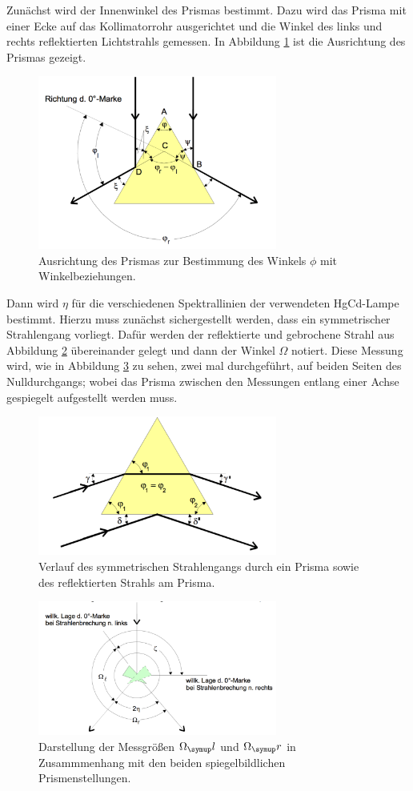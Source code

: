 Zunächst wird der Innenwinkel des Prismas bestimmt.
Dazu wird das Prisma mit einer Ecke auf das Kollimatorrohr ausgerichtet und
die Winkel des links und rechts reflektierten Lichtstrahls gemessen.
In Abbildung \ref{fig:phimessung} ist die Ausrichtung des Prismas gezeigt.
\begin{figure}
  \centering
  \includegraphics[width = 0.7\textwidth]{Pics/phimessung.pdf}
  \caption{Ausrichtung des Prismas zur Bestimmung des Winkels $\phi$ mit Winkelbeziehungen.}
  \label{fig:phimessung}
\end{figure}

Dann wird $\eta$ für die verschiedenen Spektrallinien der verwendeten HgCd-Lampe
bestimmt. Hierzu muss zunächst sichergestellt werden, dass ein symmetrischer Strahlengang vorliegt.
Dafür werden der reflektierte und gebrochene Strahl aus Abbildung \ref{fig:strahlengangsymmreflek}
übereinander gelegt und dann der Winkel $\Omega$ notiert. Diese Messung wird,
wie in Abbildung \ref{fig:winkel} zu sehen, zwei mal durchgeführt, auf beiden Seiten des Nulldurchgangs;
wobei das Prisma zwischen den Messungen entlang einer Achse gespiegelt aufgestellt werden muss.
\begin{figure}
  \centering
  \includegraphics[width = 0.7\textwidth]{Pics/strahlengangsymmreflek.pdf}
  \caption{Verlauf des symmetrischen Strahlengangs durch ein Prisma sowie des reflektierten Strahls am Prisma.}
  \label{fig:strahlengangsymmreflek}
\end{figure}

\begin{figure}
  \centering
  \includegraphics[width = 0.7\textwidth]{Pics/winkel.pdf}
  \caption{Darstellung der Messgrößen $\Omega_\g{l}$ und $\Omega_\g{r}$ in Zusammmenhang mit den beiden spiegelbildlichen Prismenstellungen.}
  \label{fig:winkel}
\end{figure}
